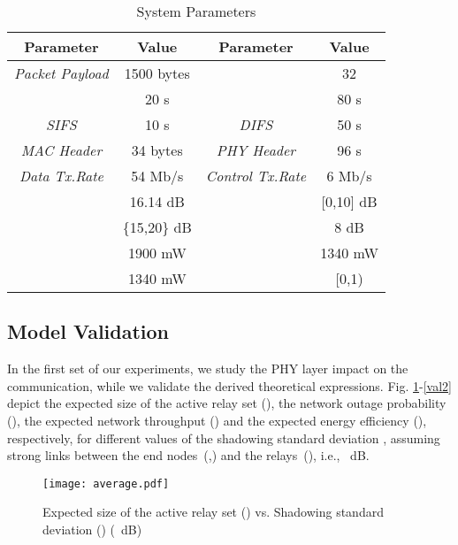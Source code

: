 \documentclass[12pt,draftcls, onecolumn]{IEEEtran}
\begin{document}
\begin{table}[htb]
\caption{System Parameters} \label{t2}
\begin{center}
\begin{tabular}{|c|c||c|c|}
\hline
\textbf{Parameter} & \textbf{Value} & \textbf{Parameter} & \textbf{Value} \\ \hline
\textit{Packet Payload} & 1500 bytes & \textit{} & 32\\ \hline
\textit{} & 20 s & \textit{} & 80 s \\ \hline
\textit{SIFS} & 10 s & \textit{DIFS} & 50 s\\ \hline
\textit{MAC Header} & 34 bytes & \textit{PHY Header} & 96 s \\ \hline
\textit{Data Tx.Rate} & 54 Mb/s & \textit{Control Tx.Rate} & 6 Mb/s \\ \hline
 & 16.14 dB &  & [0,10] dB\\ \hline
 & \{15,20\} dB &  & 8 dB\\ \hline
\textit{} & 1900 mW & \textit{} & 1340 mW \\ \hline
\textit{} & 1340 mW &  & [0,1) \\ \hline
 \end{tabular}
\end{center}
\end{table}

\subsection{Model Validation}
\label{sec:validation}

In the first set of our experiments, we study the PHY layer impact on the communication, while we validate the derived theoretical expressions. Fig. \ref{phyf1}-\ref{val2} depict the expected size of the active relay set (), the network outage probability (), the expected network throughput () and the expected energy efficiency (), respectively, for different values of the shadowing standard deviation , assuming strong links between the end nodes~(,) and the relays~(), i.e., ~dB.

\begin{figure}[htb]
\centering
\texttt{[image: average.pdf]}
\caption{Expected size of the active relay set () vs. Shadowing standard deviation () (~dB)}\label{phyf1}
\end{figure}
\end{document}
